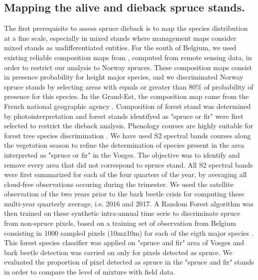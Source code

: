 \documentclass[3p,procedia]{elsarticle}
\begin{document}
\subsection{Mapping the alive and dieback spruce stands.}
The first prerequisite to assess spruce dieback is to map the species distribution at a fine scale, especially in mixed stands where management maps consider mixed stands as undifferentiated entities.
For the south of Belgium, we used existing reliable composition maps from \cite{bolyn_mapping_2022}, computed from remote sensing data, in order to restrict our analysis to Norway spruces. 
These composition maps consist in presence probability for height major species, and we discriminated Norway spruce stands by selecting areas with equals or greater than 80\% of probability of presence for this species.  
In the Grand-Est, the composition map came from the French national geographic agency \citep{IGN_bd_2018}. 
Composition of forest stand was determined by photointerpretation and forest stands identifyed as "spruce or fir" were first selected to restrict the dieback analysis. 
Phenology courses are highly suitable for forest tree species discrimination \citep{lisein_discrimination_2015,grabska_forest_2019,ma_tree_2021}.
We have used S2 spectral bands courses along the vegetation season to refine the determination of species present in the area interpreted as "spruce or fir" in the Vosges.
The objective was to identify and remove every area that did not correspond to spruce stand.
All S2 spectral bands were first summarized for each of the four quarters of the year, by averaging all cloud-free observations occuring during the trimester.
We used the satellite observation of the two years prior to the bark beetle crisis for computing these multi-year quarterly average, i.e. 2016 and 2017.
A Random Forest algorithm was then trained on these synthetic intra-annual time serie to discriminate spruce from non-spruce pixels, based on a training set of observation from Belgium consisting in 1000 sampled pixels (10mx10m) for each of the eigth major species \citep{bolyn_forest_2018}.
This forest species classifier was applied on "spruce and fir" area of Vosges and bark beetle detection was carried on only for pixels detected as spruce. 
We evaluated the proportion of pixel detected as spruce in the "spruce and fir" stands in order to compare the level of mixture with field data.
\end{document}
